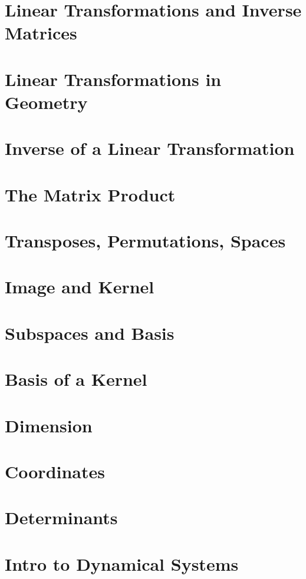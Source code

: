 \documentclass[11pt]{article}
\begin{document}
\section{Linear Transformations and Inverse Matrices}


\section{Linear Transformations in Geometry}


\section{Inverse of a Linear Transformation}


\section{The Matrix Product}


\section{Transposes, Permutations, Spaces}


\section{Image and Kernel}


\section{Subspaces and Basis}


\section{Basis of a Kernel}


\section{Dimension}


\section{Coordinates}


\section{Determinants}


\section{Intro to Dynamical Systems}


\end{document}
